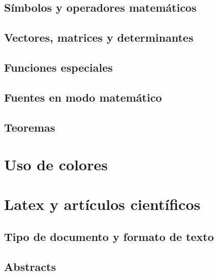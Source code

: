 \documentclass{article}
\begin{document}
\subsection{Símbolos y operadores matemáticos}

\subsection{Vectores, matrices y determinantes}

\subsection{Funciones especiales}

\subsection{Fuentes en modo matemático}

\subsection{Teoremas}

\section{Uso de colores}

\section{Latex y artículos científicos}

\subsection{Tipo de documento y formato de texto}

\subsection{Abstracts}
\end{document}
